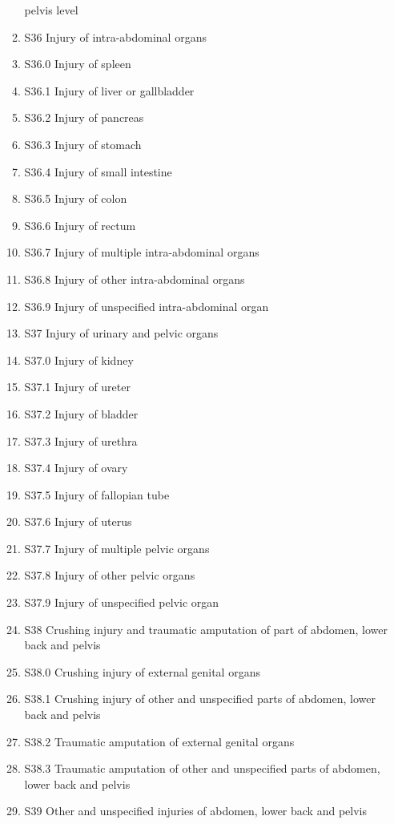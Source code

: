 \documentclass[
]{scrartcl}
\begin{document}
\begin{itemize}
\begin{enumerate}
    pelvis level
  \item
    S36 Injury of intra-abdominal organs
  \item
    S36.0 Injury of spleen
  \item
    S36.1 Injury of liver or gallbladder
  \item
    S36.2 Injury of pancreas
  \item
    S36.3 Injury of stomach
  \item
    S36.4 Injury of small intestine
  \item
    S36.5 Injury of colon
  \item
    S36.6 Injury of rectum
  \item
    S36.7 Injury of multiple intra-abdominal organs
  \item
    S36.8 Injury of other intra-abdominal organs
  \item
    S36.9 Injury of unspecified intra-abdominal organ
  \item
    S37 Injury of urinary and pelvic organs
  \item
    S37.0 Injury of kidney
  \item
    S37.1 Injury of ureter
  \item
    S37.2 Injury of bladder
  \item
    S37.3 Injury of urethra
  \item
    S37.4 Injury of ovary
  \item
    S37.5 Injury of fallopian tube
  \item
    S37.6 Injury of uterus
  \item
    S37.7 Injury of multiple pelvic organs
  \item
    S37.8 Injury of other pelvic organs
  \item
    S37.9 Injury of unspecified pelvic organ
  \item
    S38 Crushing injury and traumatic amputation of part of abdomen,
    lower back and pelvis
  \item
    S38.0 Crushing injury of external genital organs
  \item
    S38.1 Crushing injury of other and unspecified parts of abdomen,
    lower back and pelvis
  \item
    S38.2 Traumatic amputation of external genital organs
  \item
    S38.3 Traumatic amputation of other and unspecified parts of
    abdomen, lower back and pelvis
  \item
    S39 Other and unspecified injuries of abdomen, lower back and pelvis

\end{enumerate}
\end{itemize}
\end{document}
